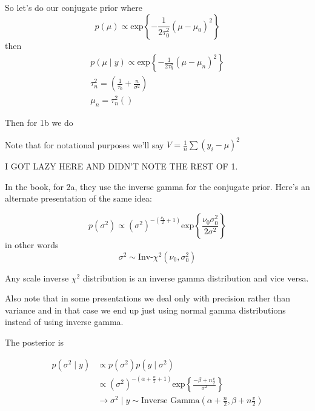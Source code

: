 \documentclass[a4paper]{article}
\begin{document}
So let's do our conjugate prior where
\begin{equation}
	p\left( \mu \right) \propto \text{exp}\left\{ - \frac{1}{2 \tau _0 ^2}\left( \mu - \mu_0 \right) ^2 \right\}
\end{equation}
then
\begin{align}
	p\left( \mu \mid y \right) \propto \text{exp}\left\{ -\frac{1}{2 \tau_n ^2}\left( \mu - \mu _n \right) ^2 \right\}\\
	\tau _n ^2 = \left( \frac{1}{\tau _0} + \frac{n}{\sigma ^2} \right)\\
	\mu _n = \tau _n ^2 \left(  \right)
\end{align}

Then for 1b
we do

Note that for notational purposes we'll say $V = \frac{1}{n} \sum \left( y_i - \mu \right) ^2$

I GOT LAZY HERE AND DIDN'T NOTE THE REST OF 1.

In the book, for 2a, they use the inverse gamma for the conjugate prior. Here's an alternate presentation of the same idea:

\begin{equation}
	p\left( \sigma ^2 \right) \propto \left( \sigma ^2 \right) ^{- \left( \frac{\nu_0}{2} + 1 \right)} \text{exp}\left\{ \frac{\nu_0 \sigma _0 ^2}{2 \sigma ^2} \right\}
\end{equation}
in other words
\begin{equation}
	\sigma ^2 \sim \text{Inv-$\chi ^2$}\left( \nu_0, \sigma _0 ^2 \right)
\end{equation}

Any scale inverse $\chi ^2$ distribution is an inverse gamma distribution and vice versa.

Also note that in some presentations we deal only with precision rather than variance and in that case we end up just using normal gamma distributions instead of using inverse gamma.

The posterior is

\begin{align}
	p\left( \sigma ^2 \mid y \right) &\propto p\left( \sigma^2 \right)p\left( y \mid \sigma ^2 \right)\\
	&\propto \left( \sigma ^2 \right)^{-\left( \alpha + \frac{n}{2} + 1 \right)} \text{exp}\left\{ \frac{-\beta + n \frac{v}{2}}{\sigma ^2} \right\}\\
	&\rightarrow \sigma ^2 \mid y \sim \text{Inverse Gamma}\left( \alpha + \frac{n}{2}, \beta + n \frac{v}{2} \right)
\end{align}
\end{document}
